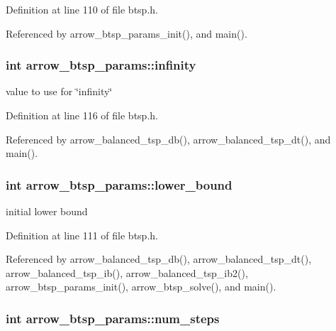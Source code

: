 Definition at line 110 of file btsp.h.

Referenced by arrow\_\-btsp\_\-params\_\-init(), and main().\hypertarget{structarrow__btsp__params_a035c57dbce866d9b880f2cb9b5a74ed}{
\subsubsection[{infinity}]{\setlength{\rightskip}{0pt plus 5cm}int {\bf arrow\_\-btsp\_\-params::infinity}}}
\label{structarrow__btsp__params_a035c57dbce866d9b880f2cb9b5a74ed}


value to use for \char`\"{}infinity\char`\"{} 

Definition at line 116 of file btsp.h.

Referenced by arrow\_\-balanced\_\-tsp\_\-db(), arrow\_\-balanced\_\-tsp\_\-dt(), and main().\hypertarget{structarrow__btsp__params_da747e3797f9327834e4dbb1459d2786}{
\subsubsection[{lower\_\-bound}]{\setlength{\rightskip}{0pt plus 5cm}int {\bf arrow\_\-btsp\_\-params::lower\_\-bound}}}
\label{structarrow__btsp__params_da747e3797f9327834e4dbb1459d2786}


initial lower bound 

Definition at line 111 of file btsp.h.

Referenced by arrow\_\-balanced\_\-tsp\_\-db(), arrow\_\-balanced\_\-tsp\_\-dt(), arrow\_\-balanced\_\-tsp\_\-ib(), arrow\_\-balanced\_\-tsp\_\-ib2(), arrow\_\-btsp\_\-params\_\-init(), arrow\_\-btsp\_\-solve(), and main().\hypertarget{structarrow__btsp__params_2897d24f2fdd53c723609cf68880f55e}{
\subsubsection[{num\_\-steps}]{\setlength{\rightskip}{0pt plus 5cm}int {\bf arrow\_\-btsp\_\-params::num\_\-steps}}}
\label{structarrow__btsp__params_2897d24f2fdd53c723609cf68880f55e}



